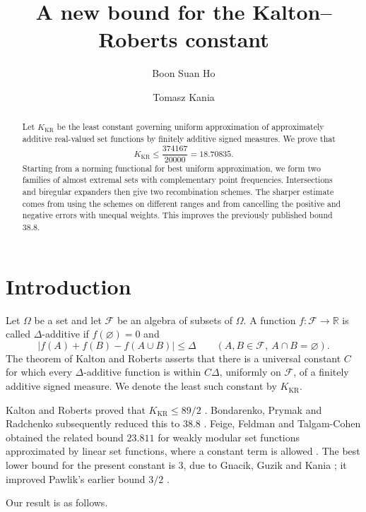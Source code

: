 \documentclass[11pt,a4paper]{amsart}
\title[A new bound for the Kalton--Roberts constant]{A new bound for the Kalton--Roberts constant}
\author[B.~S.~Ho]{Boon Suan Ho}
\author[T.~Kania]{Tomasz Kania}
\newcommand{\cF}{\mathcal F}
\newcommand{\KR}{K_{\mathrm{KR}}}
\newcommand{\RR}{\mathbb R}
\begin{document}
\begin{abstract}
Let \(\KR\) be the least constant governing uniform approximation of
approximately additive real-valued set functions by finitely additive signed
measures.  We prove that
\[
        \KR\leqslant \frac{374167}{20000}=18.70835.
\]
Starting from a norming functional for best uniform approximation, we form
two families of almost extremal sets with complementary point frequencies.
Intersections and biregular expanders then give two recombination schemes.
The sharper estimate comes from using the schemes on different ranges and
from cancelling the positive and negative errors with unequal weights.  This
improves the previously published bound \(38.8\).
\end{abstract}

\maketitle

\section{Introduction}

Let \(\Omega\) be a set and let \(\cF\) be an algebra of subsets of
\(\Omega\).  A function \(f\colon\cF\to\RR\) is called
\(\Delta\)-additive if \(f(\varnothing)=0\) and
\begin{equation}\label{eq:additivity}
 \lvert f(A)+f(B)-f(A\cup B)\rvert\leqslant\Delta
 \qquad(A,B\in\cF,\ A\cap B=\varnothing).
\end{equation}
The theorem of Kalton and Roberts asserts that there is a universal constant
\(C\) for which every \(\Delta\)-additive function is within \(C\Delta\),
uniformly on \(\cF\), of a finitely additive signed measure.  We denote the
least such constant by \(\KR\).

Kalton and Roberts proved that \(\KR\leqslant89/2\)
\cite{KaltonRoberts}.  Bondarenko, Prymak and Radchenko subsequently reduced
this to \(38.8\) \cite{BondarenkoPrymakRadchenko}.  Feige, Feldman and
Talgam-Cohen obtained the related bound \(23.811\) for weakly modular set
functions approximated by linear set functions, where a constant term is
allowed \cite{FeigeFeldmanTalgamCohen}.  The best lower bound for the present
constant is \(3\), due to Gnacik, Guzik and Kania
\cite{GnacikGuzikKania}; it improved Pawlik's earlier bound \(3/2\)
\cite{Pawlik}.

Our result is as follows.
\end{document}
